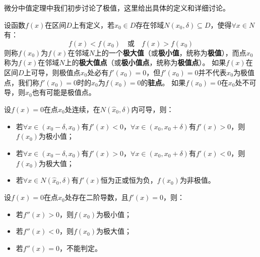 微分中值定理中我们初步讨论了极值，这里给出具体的定义和详细讨论。

\begin{definition}[极值和极值点]
设函数$f\left( x \right) $在区间$D$上有定义，若$x_0\in D$存在邻域$N\left( x_0,\delta \right) \subseteq D$，使得$\forall x\in N$有：
\[
f\left( x \right) <f\left( x_0 \right) \quad \text{或} \quad f\left( x \right) >f\left( x_0 \right)
\]
则称$f\left( x_0 \right) $为$f\left( x \right) $在邻域$N$上的一个{\bf 极大值}（或{\bf 极小值}，统称为{\bf 极值}），而点$x_0$称为$f\left( x \right) $在邻域$N$上的{\bf 极大值点}（或{\bf 极小值点}，统称为{\bf 极值点}）。
如果$f\left( x \right) $在区间$D$上可导，则极值点$x_0$处必有$f'\left( x_0 \right) =0$，但$f'\left( x_0 \right) =0$并不代表$x_0$为极值点，我们称$f'\left( x_0 \right) =0$时的$x_0$为$f\left( x_0 \right) =0$的{\bf 驻点}。
如果$f\left( x_0 \right) =0$在$x_0$处不可导，则$x_0$也有可能是极值点。
\end{definition}

\begin{theorem} \label{th_2_6_1}
设$f\left( x \right) =0$在点$x_0$处连续，在$N\left( \hat{x}_0,\delta \right) $内可导，则：
\begin{itemize}
    \item 若$\forall x\in \left( x_0-\delta ,x_0 \right) $有$f'\left( x \right) <0$，$\forall x\in \left( x_0,x_0+\delta \right) $有$f'\left( x \right) >0$，则$f\left( x_0 \right) $为极小值；
    \item 若$\forall x\in \left( x_0-\delta ,x_0 \right) $有$f'\left( x \right) >0$，$\forall x\in \left( x_0,x_0+\delta \right) $有$f'\left( x \right) <0$，则$f\left( x_0 \right) $为极大值；
    \item 若$\forall x\in N\left( \hat{x}_0,\delta \right) $有$f'\left( x \right) $恒为正或恒为负，$f\left( x_0 \right) $为非极值。
\end{itemize}
\end{theorem}

\begin{theorem} \label{th_2_6_2}
设$f\left( x \right) =0$在点$x_0$处存在二阶导数，且$f'\left( x \right) =0$，则：
\begin{itemize}
    \item 若$f''\left( x \right) >0$，则$f\left( x_0 \right) $为极小值；
    \item 若$f''\left( x \right) <0$，则$f\left( x_0 \right) $为极大值；
    \item 若$f''\left( x \right) =0$，不能判定。
\end{itemize}
\end{theorem}

